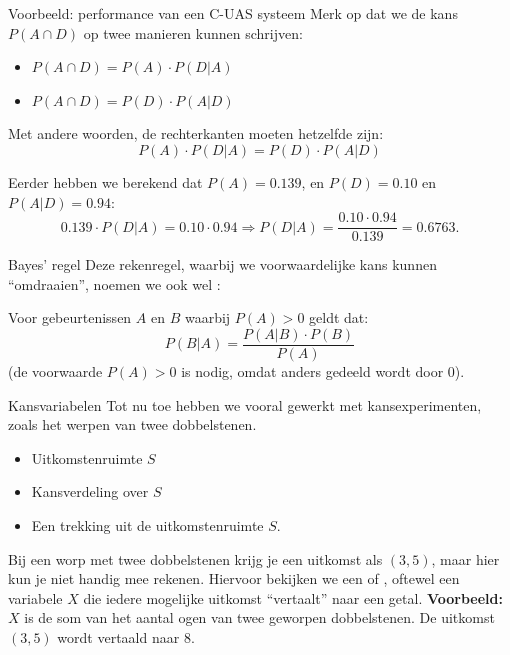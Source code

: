 \begin{frame}{Voorbeeld: performance van een C-UAS systeem}
    Merk op dat we de kans $P(A \cap D)$ op twee manieren kunnen schrijven:
    \begin{itemize}
        \item $P(A \cap D) = P(A) \cdot P(D | A)$
        \item $P(A \cap D) = P(D) \cdot P(A | D)$
    \end{itemize}
    Met andere woorden, de rechterkanten moeten hetzelfde zijn:
    \[
        P(A) \cdot P(D | A) = P(D) \cdot P(A | D)
    \]
    
    Eerder hebben we berekend dat $P(A) = 0.139$, en $P(D) = 0.10$ en $P(A | D) = 0.94$:
    \[
        0.139 \cdot P(D | A) = 0.10 \cdot 0.94 \Rightarrow P(D | A) = \frac{0.10 \cdot 0.94}{0.139} = 0.6763.
    \]
\end{frame}

\begin{frame}{Bayes' regel}
    Deze rekenregel, waarbij we voorwaardelijke kans kunnen \enquote{omdraaien}, noemen we ook wel :\vfill

    Voor gebeurtenissen $A$ en $B$ waarbij $P(A) > 0$ geldt dat:
    \[
        P(B | A) = \frac{P(A | B) \cdot P(B)}{P(A)}
    \]
    (de voorwaarde $P(A) > 0$ is nodig, omdat anders gedeeld wordt door $0$).
\end{frame}

\begin{frame}{Kansvariabelen}
    Tot nu toe hebben we vooral gewerkt met kansexperimenten, zoals het werpen van twee dobbelstenen.
    \begin{itemize}
        \item Uitkomstenruimte $S$
        \item Kansverdeling over $S$
        \item Een trekking uit de uitkomstenruimte $S$.
    \end{itemize}
    \vfill\pause
    Bij een worp met twee dobbelstenen krijg je een uitkomst als $(3, 5)$, maar hier kun je niet handig mee rekenen.
    \vfill\pause
    Hiervoor bekijken we een  of , oftewel een variabele $X$ die iedere mogelijke uitkomst \enquote{vertaalt} naar een getal. 
    \vfill\pause
    \textbf{Voorbeeld:} $X$ is de som van het aantal ogen van twee geworpen dobbelstenen. De uitkomst $(3, 5)$ wordt vertaald naar $8$. 
\end{frame}

